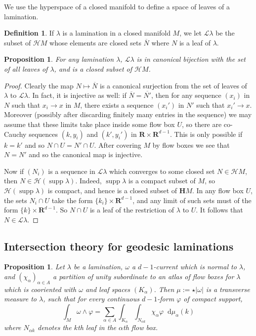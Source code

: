 \documentclass[reqno,10pt]{amsart}
\newcommand{\RR}{\mathbf{R}}
\newcommand{\Hyp}{\mathbf H}
\newcommand*\dif{\mathop{}\!\mathrm{d}}
\DeclareMathOperator{\supp}{supp}
\newcommand{\Leaves}{\mathscr L}
\newcommand{\Hypspace}{\mathscr H}
\newtheorem{proposition}[theorem]{Proposition}
\theoremstyle{definition}
\newtheorem{definition}[theorem]{Definition}
\numberwithin{equation}{section}
\begin{document}
We use the hyperspace of a closed manifold to define a space of leaves of a lamination.

\begin{definition}
If $\lambda$ is a lamination in a closed manifold $M$, we let $\Leaves \lambda$ be the subset of $\Hypspace M$ whose elements are closed sets $\overline N$ where $N$ is a leaf of $\lambda$.
\end{definition}

\begin{proposition}
For any lamination $\lambda$, $\Leaves \lambda$ is in canonical bijection with the set of all leaves of $\lambda$, and is a closed subset of $\Hypspace M$.
\end{proposition}
\begin{proof}
Clearly the map $N \mapsto \overline N$ is a canonical surjection from the set of leaves of $\lambda$ to $\Leaves \lambda$.
In fact, it is injective as well: if $\overline N = \overline{N'}$, then for any sequence $(x_i)$ in $N$ such that $x_i \to x$ in $M$, there exists a sequence $(x_i')$ in $N'$ such that $x_i' \to x$.
Moreover (possibly after discarding finitely many entries in the sequence) we may assume that these limits take place inside some flow box $U$, so there are co-Cauchy sequences $(k, y_i)$ and $(k', y_i')$ in $\RR \times \RR^{d - 1}$.
This is only possible if $k = k'$ and so $N \cap U = N' \cap U$.
After covering $M$ by flow boxes we see that $N = N'$ and so the canonical map is injective.

Now if $(N_i)$ is a sequence in $\Leaves \lambda$ which converges to some closed set $N \in \Hypspace M$, then $N \in \Hypspace(\supp \lambda)$.
Indeed, $\supp \lambda$ is a compact subset of $M$, so $\Hypspace(\supp \lambda)$ is compact, and hence is a closed subset of $\Hyp M$.
In any flow box $U$, the sets $N_i \cap U$ take the form $\{k_i\} \times \RR^{d - 1}$, and any limit of such sets must of the form $\{k\} \times \RR^{d - 1}$.
So $N \cap U$ is a leaf of the restriction of $\lambda$ to $U$.
It follows that $N \in \Leaves \lambda$.
\end{proof}


\subsection{Intersection theory for geodesic laminations}

\begin{proposition}\label{construction of ruelle sullivan currents}
Let $\lambda$ be a lamination, $\omega$ a $d-1$-current which is normal to $\lambda$, and $(\chi_\alpha)_{\alpha \in A}$ a partition of unity subordinate to an atlas of flow boxes for $\lambda$ which is cooriented with $\omega$ and leaf spaces $(K_\alpha)$.
Then $\mu := \star |\omega|$ is a transverse measure to $\lambda$, such that for every continuous $d-1$-form $\varphi$ of compact support,
$$\int_M \omega \wedge \varphi = \sum_{\alpha \in A} \int_{K_\alpha} \int_{N_{\alpha k}} \chi_\alpha \varphi \dif \mu_\alpha(k)$$
where $N_{\alpha k}$ denotes the $k$th leaf in the $\alpha$th flow box.
\end{proposition}
\end{document}
